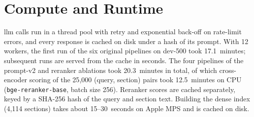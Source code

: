 \section{Compute and Runtime}\label{ax:log:runtime}

\gls{llm} calls run in a thread pool with retry and exponential back-off on
rate-limit errors, and every response is cached on disk under a hash of its prompt.
With 12 workers, the first run of the six original pipelines on dev-500 took
17.1~minutes; subsequent runs are served from the cache in seconds. The four
pipelines of the prompt-v2 and reranker ablations took 20.3~minutes in total, of
which cross-encoder scoring of the 25{,}000 (query, section) pairs took
12.5~minutes on CPU (\texttt{bge-reranker-base}, batch size 256). Reranker scores
are cached separately, keyed by a SHA-256 hash of the query and section text.
Building the dense index (4{,}114 sections) takes about 15--30~seconds on Apple MPS
and is cached on disk.
